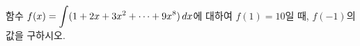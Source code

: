 함수 $f(x)=\displaystyle\int (1+2x+3x^2+\cdots+9x^8)\mkern3mu dx$에 대하여 $f(1)=10$일 때, $f(-1)$의 값을 구하시오.
